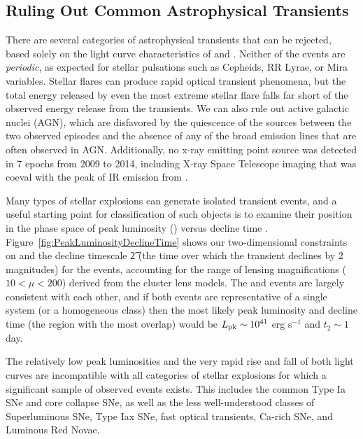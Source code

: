 \begin{multicols}{2}
  
\subsection{Ruling Out Common Astrophysical Transients}

There are several categories of astrophysical transients that can be
rejected, based solely on the light curve characteristics of \spockone
and \spocktwo. Neither of the \spock events are {\it periodic}, as
expected for stellar pulsations such as Cepheids, RR Lyrae, or Mira
variables. Stellar flares can produce rapid optical transient
phenomena, but the total energy released by even the most extreme
stellar flare\cite{Karoff:2016} falls far short of the observed energy
release from the \spock transients. We can also rule out active
galactic nuclei (AGN), which are disfavored by the quiescence of the
\spock sources between the two observed episodes and the absence of
any of the broad emission lines that are often observed in AGN.
Additionally, no x-ray emitting point source was detected in 7 epochs
from 2009 to 2014, including \Chandra X-ray Space Telescope imaging
that was coeval with the peak of IR emission from \spocktwo.

Many types of stellar explosions can generate isolated transient
events, and a useful starting point for classification of such objects
is to examine their position in the phase space of peak luminosity
(\Lpk) versus decline time \cite{Kulkarni:2007}.
Figure~\ref{fig:PeakLuminosityDeclineTime} shows our two-dimensional
constraints on \Lpk and the decline timescale \t2 (the time over which
the transient declines by 2 magnitudes) for the \spock events,
accounting for the range of lensing magnifications ($10<\mu<200$)
derived from the cluster lens models.  The \spockone and \spocktwo
events are largely consistent with each other, and if both events are
representative of a single system (or a homogeneous class) then the
most likely peak luminosity and decline time (the region with the most
overlap) would be $L_{\rm pk}\sim10^{41}$ erg s$^{-1}$ and $t_2\sim1$
day.

The relatively low peak luminosities and the very rapid rise and fall
of both \spock light curves are incompatible with all categories of
stellar explosions for which a significant sample of observed events
exists.  This includes the common Type Ia SNe and core collapse SNe,
as well as the less well-understood classes of Superluminous
SNe\cite{GalYam:2012}, Type Iax SNe\citep{Foley:2013a}, fast optical
transients\cite{Drout:2014}, Ca-rich SNe\cite{Kasliwal:2012}, and
Luminous Red Novae\cite{Kulkarni:2007}.


\end{multicols}
